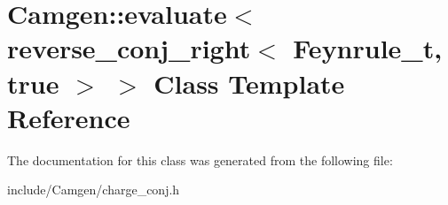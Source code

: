 \hypertarget{a00188}{}\section{Camgen\+:\+:evaluate$<$ reverse\+\_\+conj\+\_\+right$<$ Feynrule\+\_\+t, true $>$ $>$ Class Template Reference}
\label{a00188}


The documentation for this class was generated from the following file\+:\begin{DoxyCompactItemize}
\item 
include/\+Camgen/charge\+\_\+conj.\+h\end{DoxyCompactItemize}
